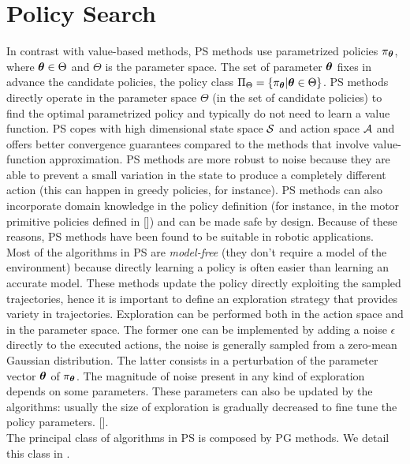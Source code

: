 \section{Policy Search}\label{sec:ps}
In contrast with value-based methods, \acf{PS} methods use parametrized policies $\pi_{\boldsymbol{\theta}}$, where $\boldsymbol{\theta} \in \Theta$ and $\Theta$ is the parameter space. The set of parameter $\boldsymbol{\theta}$ fixes in advance the candidate policies, \ie the policy class $\Pi_{\Theta} = \{ \pi_{\boldsymbol{\theta}} | \boldsymbol{\theta} \in \Theta \}$. \ac{PS} methods directly operate in the parameter space $\Theta$ (\ie in the set of candidate policies) to find the optimal parametrized policy and typically do not need to learn a value function. \ac{PS} copes with high dimensional state space $\mathcal{S}$ and action space $\mathcal{A}$ and offers better convergence guarantees compared to the methods that involve value-function approximation. \ac{PS} methods are more robust to noise because they are able to prevent a small variation in the state to produce a completely different action (this can happen in greedy policies, for instance). \ac{PS} methods can also incorporate domain knowledge in the policy definition (for instance, in the motor primitive policies defined in [\cite{Peters2008ReinforcementLO}]) and can be made safe by design. Because of these reasons, \ac{PS} methods have been found to be suitable in robotic applications.\\
\newline
Most of the algorithms in \ac{PS} are \emph{model-free} (\ie they don't require a model of the environment) because directly learning a policy is often easier than learning an accurate model. These methods update the policy directly exploiting the sampled trajectories, hence it is important to define an exploration strategy that provides variety in trajectories. Exploration can be performed both in the action space and in the parameter space. The former one can be implemented by adding a noise $\epsilon$ directly to the executed actions, the noise is generally sampled from a zero-mean Gaussian distribution. The latter consists in a perturbation of the parameter vector $\boldsymbol{\theta}$ of $\pi_{\boldsymbol{\theta}}$. The magnitude of noise present in any kind of exploration depends on some parameters. These parameters can also be updated by the algorithms: usually the size of exploration is gradually decreased to fine tune the policy parameters. [\cite{deisenroth2013Survey}].\\
\newline
The principal class of algorithms in \ac{PS} is composed by \acf{PG} methods. We detail this class in .

